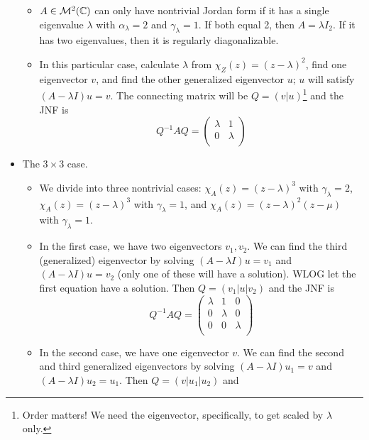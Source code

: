 \documentclass[../notes.tex]{subfiles}
\begin{document}
\begin{itemize}
    \begin{itemize}
        \item $A\in\mathcal{M}^2(\mathbb{C})$ can only have nontrivial Jordan form if it has a single eigenvalue $\lambda$ with $\alpha_\lambda=2$ and $\gamma_\lambda=1$. If both equal 2, then $A=\lambda I_2$. If it has two eigenvalues, then it is regularly diagonalizable.
        \item In this particular case, calculate $\lambda$ from $\chi_Z(z)=(z-\lambda)^2$, find one eigenvector $v$, and find the other generalized eigenvector $u$; $u$ will satisfy $(A-\lambda I)u=v$. The connecting matrix will be $Q=(v|u)$\footnote{Order matters! We need the eigenvector, specifically, to get scaled by $\lambda$ only.} and the JNF is
        \begin{equation*}
            Q^{-1}AQ =
            \begin{pmatrix}
                \lambda & 1\\
                0 & \lambda\\
            \end{pmatrix}
        \end{equation*}
    \end{itemize}
    \item The $3\times 3$ case.
    \begin{itemize}
        \item We divide into three nontrivial cases: $\chi_A(z)=(z-\lambda)^3$ with $\gamma_\lambda=2$, $\chi_A(z)=(z-\lambda)^3$ with $\gamma_\lambda=1$, and $\chi_A(z)=(z-\lambda)^2(z-\mu)$ with $\gamma_\lambda=1$.
        \item In the first case, we have two eigenvectors $v_1,v_2$. We can find the third (generalized) eigenvector by solving $(A-\lambda I)u=v_1$ and $(A-\lambda I)u=v_2$ (only one of these will have a solution). WLOG let the first equation have a solution. Then $Q=(v_1|u|v_2)$ and the JNF is
        \begin{equation*}
            Q^{-1}AQ =
            \begin{pmatrix}
                \lambda & 1 & 0\\
                0 & \lambda & 0\\
                0 & 0 & \lambda\\
            \end{pmatrix}
        \end{equation*}
        \item In the second case, we have one eigenvector $v$. We can find the second and third generalized eigenvectors by solving $(A-\lambda I)u_1=v$ and $(A-\lambda I)u_2=u_1$. Then $Q=(v|u_1|u_2)$ and

\end{itemize}
\end{itemize}
\end{document}
